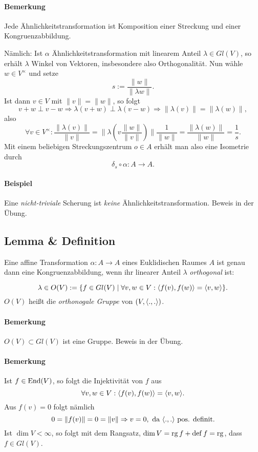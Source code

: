 \paragraph{Bemerkung}
	Jede Ähnlichkeitstransformation ist Komposition einer Streckung und einer Kongruenzabbildung.
	
	Nämlich: Ist $ \alpha $ Ähnlichkeitstransformation mit linearem Anteil $ \lambda\in Gl(V) $, so erhält $ \lambda $ Winkel von Vektoren, insbesondere also Orthogonalität.
	Nun wähle $ w\in V^\times $ und setze
		\[ s := \frac{\|w\|}{\|\lambda w\|}. \]
	Ist dann $ v\in V $ mit $ \|v\|=\|w\| $, so folgt
		\[ v+w \perp v-w \Rightarrow \lambda(v+w)\perp \lambda(v-w) \Rightarrow \|\lambda(v)\| = \|\lambda(w)\|, \]
	also 
		\[ \forall v\in V^\times: \frac{\|\lambda(v)\|}{\|v\|} = \|\lambda(v\frac{\|w\|}{\|v\|})\|\frac{1}{\|w\|} = \frac{\|\lambda (w)\|}{\|w\|} = \frac{1}{s}. \]
	Mit einem beliebigen Streckungszentrum $ o\in A $ erhält man also eine Isometrie durch
		\[ \delta_s\circ \alpha :A\to A. \]
\paragraph{Beispiel}
	Eine \emph{nicht-triviale} Scherung ist \emph{keine} Ähnlichkeitstransformation. Beweis in der Übung.

\subsection{Lemma \& Definition}
\begin{Lemma}
	Eine affine Transformation $ \alpha:A\to A $ eines Euklidischen Raumes $ A $ ist genau dann eine Kongruenzabbildung, wenn ihr linearer Anteil $ \lambda $ \emph{orthogonal} ist:
\end{Lemma}
\begin{Definition}
		\[ \lambda\in O(V):= \{f\in Gl(V)\mid \forall v,w\in V: \langle f(v),f(w) \rangle = \langle v,w \rangle\}. \]
	$ O(V) $ heißt die \emph{orthonogale Gruppe} von $ (V,\langle .,. \rangle) $.
\end{Definition}

\paragraph{Bemerkung}
	$ O(V)\subset Gl(V) $ ist eine Gruppe. Beweis in der Übung.
\paragraph{Bemerkung}
	Ist $ f\in \operatorname{End}(V) $, so folgt die Injektivität von $ f $ aus
		\[ \forall v,w\in V: \langle f(v),f(w) \rangle = \langle v,w \rangle. \]
	Aus $ f(v) = 0 $ folgt nämlich
		\[ 0 = \|f(v)\| = 0 = \|v\| \Rightarrow v = 0, \text{ da } \langle .,. \rangle\text{ pos. definit.} \]
	Ist $ \dim V <\infty $, so folgt mit dem Rangsatz, $ \dim V = \operatorname{rg} f + \operatorname{def} f = \operatorname{rg} $, dass $ f\in Gl(V) $.
	
